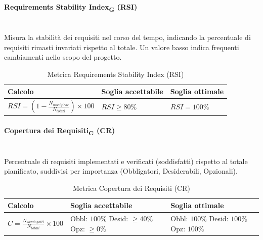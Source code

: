 \documentclass[11pt,a4paper]{article}
\begin{document}
\paragraph{Requirements Stability Index\textsubscript{G} (RSI)} \hfill \\
Misura la stabilità dei requisiti nel corso del tempo, indicando la percentuale di requisiti rimasti invariati rispetto al totale. Un valore basso indica frequenti cambiamenti nello scopo del progetto.

\begin{table}[H]
    \centering
    \renewcommand{\arraystretch}{1.5}
    \begin{tabular}{|M{0.4\textwidth}|M{0.25\textwidth}|M{0.25\textwidth}|}
        \hline
        \textbf{Calcolo} & \textbf{Soglia accettabile} & \textbf{Soglia ottimale} \\
        \hline
        $RSI = (1 - \frac{N_{modifiche}}{N_{totali}}) \times 100$ & $RSI \ge 80\%$ & $RSI = 100\%$ \\
        \hline
    \end{tabular}
    \caption{Metrica Requirements Stability Index (RSI)}
\end{table}

\paragraph{Copertura dei Requisiti\textsubscript{G} (CR)} \hfill \\
Percentuale di requisiti implementati e verificati (soddisfatti) rispetto al totale pianificato, suddivisi per importanza (Obbligatori, Desiderabili, Opzionali).

\begin{table}[H]
    \centering
    \renewcommand{\arraystretch}{1.5}
    \begin{tabular}{|M{0.4\textwidth}|M{0.25\textwidth}|M{0.25\textwidth}|}
        \hline
        \textbf{Calcolo} & \textbf{Soglia accettabile} & \textbf{Soglia ottimale} \\
        \hline
        $C = \frac{N_{soddisfatti}}{N_{totali}} \times 100$ & 
        Obbl: $100\%$ \newline Desid: $\ge 40\%$ \newline Opz: $\ge 0\%$ & 
        Obbl: $100\%$ \newline Desid: $100\%$ \newline Opz: $100\%$ \\
        \hline
    \end{tabular}
    \caption{Metrica Copertura dei Requisiti (CR)}
\end{table}
\end{document}
